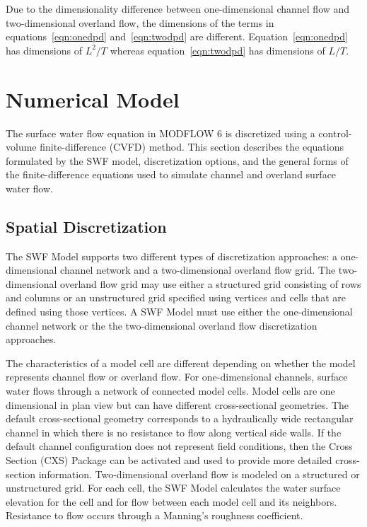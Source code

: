 \documentclass[fleqn]{article}
\begin{document}
Due to the dimensionality difference between one-dimensional channel flow and two-dimensional overland flow, the dimensions of the terms in equations~\ref{eqn:onedpd} and~\ref{eqn:twodpd} are different.  Equation~\ref{eqn:onedpd} has dimensions of $L^2/T$ whereas equation~\ref{eqn:twodpd} has dimensions of $L/T$.

\section{Numerical Model}
The surface water flow equation in MODFLOW 6 is discretized using a control-volume finite-difference (CVFD) method. This section describes the equations formulated by the SWF model, discretization options, and the general forms of the finite-difference equations used to simulate channel and overland surface water flow.

\subsection{Spatial Discretization}

The SWF Model supports two different types of discretization approaches: a one-dimensional channel network and a two-dimensional overland flow grid.  The two-dimensional overland flow grid may use either a structured grid consisting of rows and columns or an unstructured grid specified using vertices and cells that are defined using those vertices.  A SWF Model must use either the one-dimensional channel network or the the two-dimensional overland flow discretization approaches.  

The characteristics of a model cell are different depending on whether the model represents channel flow or overland flow.  For one-dimensional channels, surface water flows through a network of connected model cells.  Model cells are one dimensional in plan view but can have different cross-sectional geometries.  The default cross-sectional geometry corresponds to a hydraulically wide rectangular channel in which there is no resistance to flow along vertical side walls.  If the default channel configuration does not represent field conditions, then the Cross Section (CXS) Package can be activated and used to provide more detailed cross-section information.  Two-dimensional overland flow is modeled on a structured or unstructured grid.  For each cell, the SWF Model calculates the water surface elevation for the cell and for flow between each model cell and its neighbors.  Resistance to flow occurs through a Manning's roughness coefficient.
\end{document}
